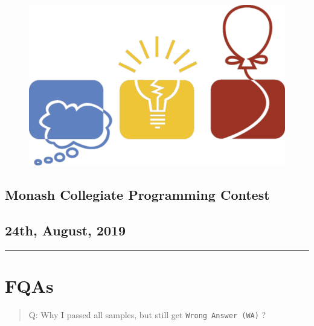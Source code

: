\documentclass[
]{article}
\date{}
\begin{document}
\begin{figure}
\centering
\includegraphics{icpc.jpg}
\end{figure}

\hypertarget{header-n33}{%
\begin{center}
\section{Monash Collegiate Programming Contest }\label{header-n33}
\end{center}
}

%
\hypertarget{header-n37}{%
\centering
\subsection{ \texorpdfstring{24th, August, 2019}{ 24th, August, 2019} }}

\begin{center}\rule{0.5\linewidth}{\linethickness}\end{center}

\newpage

\hypertarget{header-n43}{%
\section{FQAs}\label{header-n43}}

\begin{quote}
Q: Why I passed all samples, but still get \texttt{Wrong\ Answer\ (WA)} ?
\end{quote}
\end{document}
